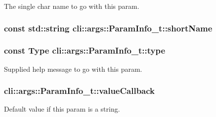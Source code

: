 The single char name to go with this param. 

\subsubsection[{\texorpdfstring{short\+Name}{shortName}}]{\setlength{\rightskip}{0pt plus 5cm}const std\+::string cli\+::args\+::\+Param\+Info\+\_\+t\+::short\+Name}\hypertarget{structcli_1_1args_1_1_param_info__t_ade36ef841b81a36f9215c7d28a26843d}{}\label{structcli_1_1args_1_1_param_info__t_ade36ef841b81a36f9215c7d28a26843d}
\subsubsection[{\texorpdfstring{type}{type}}]{\setlength{\rightskip}{0pt plus 5cm}const {\bf Type} cli\+::args\+::\+Param\+Info\+\_\+t\+::type}\hypertarget{structcli_1_1args_1_1_param_info__t_a38834b4fc7dee30a1a19a7be0dbea9ea}{}\label{structcli_1_1args_1_1_param_info__t_a38834b4fc7dee30a1a19a7be0dbea9ea}


Supplied help message to go with this param. 

\subsubsection[{\texorpdfstring{value\+Callback}{valueCallback}}]{ cli\+::args\+::\+Param\+Info\+\_\+t\+::value\+Callback}\hypertarget{structcli_1_1args_1_1_param_info__t_aab1ed9470e54a9ec255967639dc3811c}{}\label{structcli_1_1args_1_1_param_info__t_aab1ed9470e54a9ec255967639dc3811c}


Default value if this param is a string. 

